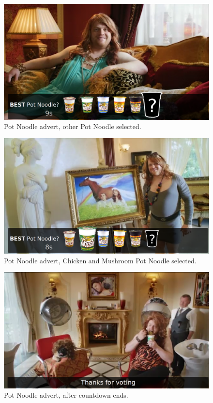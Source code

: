	\begin{figure}[th]
		\centering
		\includegraphics[width=\textwidth,height=0.5\textheight,keepaspectratio]{images/adverts/pot_noodle-2.png}
		\caption{Pot Noodle advert, other Pot Noodle selected.}
		\label{fig:potNoodle2}
	\end{figure}

	\begin{figure}[th]
		\centering
		\includegraphics[width=\textwidth,height=0.5\textheight,keepaspectratio]{images/adverts/pot_noodle-3.png}
		\caption{Pot Noodle advert, Chicken and Mushroom Pot Noodle selected.}
		\label{fig:potNoodle3}
	\end{figure}

	\begin{figure}[th]
		\centering
		\includegraphics[width=\textwidth,height=0.5\textheight,keepaspectratio]{images/adverts/pot_noodle-4.png}
		\caption{Pot Noodle advert, after countdown ends.}
		\label{fig:potNoodle4}
	\end{figure}
	
